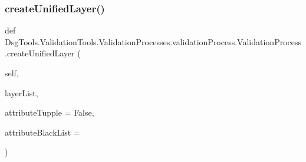 \subsubsection{\texorpdfstring{create\+Unified\+Layer()}{createUnifiedLayer()}}
{\footnotesize\ttfamily def Dsg\+Tools.\+Validation\+Tools.\+Validation\+Processes.\+validation\+Process.\+Validation\+Process.\+create\+Unified\+Layer (\begin{DoxyParamCaption}\item[{}]{self,  }\item[{}]{layer\+List,  }\item[{}]{attribute\+Tupple = {\ttfamily False},  }\item[{}]{attribute\+Black\+List = {\ttfamily \textquotesingle{}\textquotesingle{}} }\end{DoxyParamCaption})}

